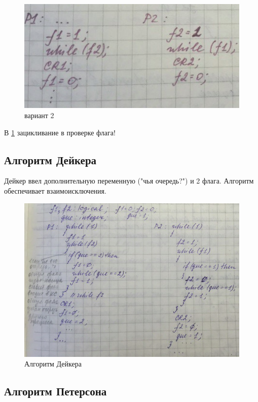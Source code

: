 \begin{figure}[H]
    \centering
    \includegraphics[width=\textwidth]{listing/2.png}
    \caption{вариант 2}
    \label{listing:prog_flag_2}
\end{figure}

В \ref{listing:prog_flag_2} зацикливание в проверке флага!

\subsection{Алгоритм Дейкера}

Дейкер ввел дополнительную переменную ("чья очередь?") и 2 флага. Алгоритм обеспечивает взаимоисключения.

\begin{figure}[H]
    \centering
    \includegraphics[width=\textwidth]{listing/3.png}
    \caption{Алгоритм Дейкера}
\end{figure}

\subsection{Алгоритм Петерсона}

